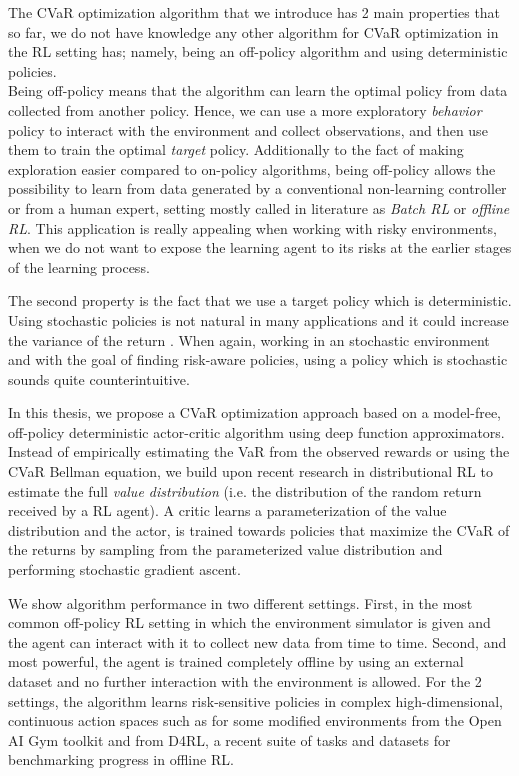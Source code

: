 The CVaR optimization algorithm that we introduce has 2 main properties that so far,
we do not have knowledge any other algorithm for CVaR optimization in the RL setting has; 
namely, being an off-policy algorithm and using deterministic policies.\\
Being off-policy means that the algorithm can learn the optimal policy from data collected
from another policy. Hence, we can use a more exploratory \textit{behavior} policy to interact
with the environment and collect observations, and then use them to train
the optimal \textit{target} policy. 
Additionally to the fact of making exploration easier compared to on-policy algorithms,
being off-policy allows the possibility to learn from data generated by a conventional
non-learning controller or from a human expert, setting mostly called in literature as
\textit{Batch RL} or \textit{offline RL}.
This application is really appealing when working with risky environments, when we do
not want to expose the learning agent to its risks at the earlier stages of the learning
process.


The second property is the fact that we use a target policy which is deterministic.
Using stochastic policies is not natural in many applications and it
could increase the variance of the return .
When again, working in an stochastic 
environment and with the goal of finding risk-aware policies, using a policy which is stochastic 
sounds quite counterintuitive.

In this thesis, we propose a CVaR optimization approach based on a model-free, off-policy
deterministic actor-critic algorithm using deep function approximators. 
Instead of empirically estimating the VaR from the observed rewards or using the CVaR
Bellman equation, we build upon recent research in distributional RL 
\citep{Bellemare2017,Dabney2018a,Dabney2018b}
to estimate the full
\textit{value distribution} (i.e. the distribution of the random return received by a RL agent).
A critic learns a parameterization of the value distribution and 
the actor, is trained towards policies that maximize the CVaR of the returns 
by sampling from the parameterized value distribution and performing stochastic gradient ascent.

We show algorithm performance in two different settings.
First, in the most common off-policy RL setting in which the environment simulator is given and
the agent can interact with it to collect new data from time to time.
Second, and most powerful, the agent is trained completely offline by using an external
dataset and no further interaction with the environment is allowed.
For the 2 settings, the algorithm learns risk-sensitive policies in
complex high-dimensional, continuous action spaces
such as for some modified environments from the Open AI Gym toolkit and from D4RL,
a recent suite of tasks and datasets for benchmarking progress in offline RL.
